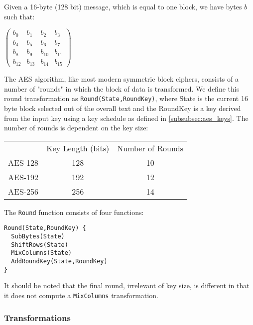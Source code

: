     Given a 16-byte (128 bit) message, which is equal to one block, we have bytes $b$ such that:
    
    \begin{center}
      $\begin{pmatrix}
        b_0 & b_1 & b_2 & b_3 \\
        b_4 & b_5 & b_6 & b_7 \\
        b_8 & b_9 & b_{10} & b_{11} \\
        b_{12} & b_{13} & b_{14} & b_{15}
      \end{pmatrix}$
    \end{center}
    
    The AES algorithm, like most modern symmetric block ciphers, consists of a number of "rounds" in which the block of data is transformed. We define this round transformation as \verb!Round(State,RoundKey)!, where State is the current 16 byte block selected out of the overall text and the RoundKey is a key derived from the input key using a key schedule as defined in \textsection\ref{subsubsec:aes_keys}. The number of rounds is dependent on the key size:
    
   
      \begin{center}
      \begin{tabular}{r|c|c|}
        \multicolumn{1}{r}{}
         &  \multicolumn{1}{c}{Key Length (bits)}
         & \multicolumn{1}{c}{Number of Rounds} \\
        \cline{2-3}
        AES-128 & 128 & 10 \\
        \cline{2-3}
        AES-192 & 192 & 12 \\
        \cline{2-3}
        AES-256 & 256 & 14 \\
        \cline{2-3}
      \end{tabular}
      \end{center}
      
    The \verb!Round! function consists of four functions:
    
    \begin{verbatim}
Round(State,RoundKey) {
  SubBytes(State)
  ShiftRows(State)
  MixColumns(State)
  AddRoundKey(State,RoundKey)
}
\end{verbatim}

    It should be noted that the final round, irrelevant of key size, is different in that it does not compute a \verb!MixColumns! transformation.
    
    \subsubsection{Transformations}
    
